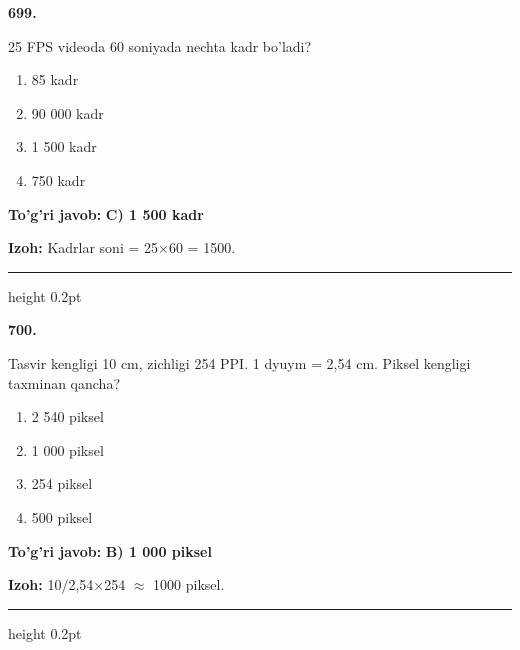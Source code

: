 \documentclass[10pt,a4paper,oneside]{article}
\begin{document}
\noindent\textbf{\color{ink}699.}
\par
25 FPS videoda 60 soniyada nechta kadr bo'ladi?
\begin{enumerate}[label=\Alph*),leftmargin=9mm]
\item 85 kadr
\item 90 000 kadr
\item 1 500 kadr
\item 750 kadr
\end{enumerate}
\begin{tcolorbox}[enhanced,breakable,colback=teal!4,colframe=teal!50!black,boxrule=0.5pt,arc=1.1mm,left=3mm,right=3mm,top=1.7mm,bottom=1.7mm,before skip=2mm,after skip=2mm]
\textbf{\color{teal}To'g'ri javob:} \textbf{C) 1 500 kadr}
\par\smallskip
\textbf{Izoh:} Kadrlar soni = 25\ensuremath{\times}60 = 1500.
\end{tcolorbox}
\vspace{2mm}\hrule height 0.2pt \vspace{3mm}

\noindent\textbf{\color{ink}700.}
\par
Tasvir kengligi 10 cm, zichligi 254 PPI. 1 dyuym = 2,54 cm. Piksel kengligi taxminan qancha?
\begin{enumerate}[label=\Alph*),leftmargin=9mm]
\item 2 540 piksel
\item 1 000 piksel
\item 254 piksel
\item 500 piksel
\end{enumerate}
\begin{tcolorbox}[enhanced,breakable,colback=teal!4,colframe=teal!50!black,boxrule=0.5pt,arc=1.1mm,left=3mm,right=3mm,top=1.7mm,bottom=1.7mm,before skip=2mm,after skip=2mm]
\textbf{\color{teal}To'g'ri javob:} \textbf{B) 1 000 piksel}
\par\smallskip
\textbf{Izoh:} 10/2,54\ensuremath{\times}254 \ensuremath{\approx} 1000 piksel.
\end{tcolorbox}
\vspace{2mm}\hrule height 0.2pt \vspace{3mm}
\end{document}

